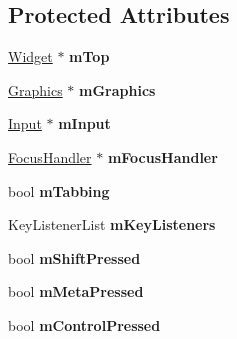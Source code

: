 \subsection*{Protected Attributes}
\begin{DoxyCompactItemize}
\item 
\hyperlink{classgcn_1_1Widget}{Widget} $\ast$ {\bfseries m\+Top}\hypertarget{classgcn_1_1Gui_a604a47aac29b2b2d102fb9adf33046dd}{}\label{classgcn_1_1Gui_a604a47aac29b2b2d102fb9adf33046dd}

\item 
\hyperlink{classgcn_1_1Graphics}{Graphics} $\ast$ {\bfseries m\+Graphics}\hypertarget{classgcn_1_1Gui_abf24a26828a0714cb5b35874f1aeb2aa}{}\label{classgcn_1_1Gui_abf24a26828a0714cb5b35874f1aeb2aa}

\item 
\hyperlink{classgcn_1_1Input}{Input} $\ast$ {\bfseries m\+Input}\hypertarget{classgcn_1_1Gui_a3a5628dce778c217e817b40e552c1dd4}{}\label{classgcn_1_1Gui_a3a5628dce778c217e817b40e552c1dd4}

\item 
\hyperlink{classgcn_1_1FocusHandler}{Focus\+Handler} $\ast$ {\bfseries m\+Focus\+Handler}\hypertarget{classgcn_1_1Gui_a6d52184d92b5fb94c9e431310e822bb9}{}\label{classgcn_1_1Gui_a6d52184d92b5fb94c9e431310e822bb9}

\item 
bool {\bfseries m\+Tabbing}\hypertarget{classgcn_1_1Gui_a1cb20f54584e46d504fabaeca4937991}{}\label{classgcn_1_1Gui_a1cb20f54584e46d504fabaeca4937991}

\item 
Key\+Listener\+List {\bfseries m\+Key\+Listeners}\hypertarget{classgcn_1_1Gui_ad8ab94f193d8a00eebc9c562e723a94c}{}\label{classgcn_1_1Gui_ad8ab94f193d8a00eebc9c562e723a94c}

\item 
bool {\bfseries m\+Shift\+Pressed}\hypertarget{classgcn_1_1Gui_a5b45556c2b53be0f21adb7e8374d9ca9}{}\label{classgcn_1_1Gui_a5b45556c2b53be0f21adb7e8374d9ca9}

\item 
bool {\bfseries m\+Meta\+Pressed}\hypertarget{classgcn_1_1Gui_af12c89543b16cffb8c2d3696058ea105}{}\label{classgcn_1_1Gui_af12c89543b16cffb8c2d3696058ea105}

\item 
bool {\bfseries m\+Control\+Pressed}\hypertarget{classgcn_1_1Gui_afc00084e5947095924a868c2a3e39c39}{}\label{classgcn_1_1Gui_afc00084e5947095924a868c2a3e39c39}


\end{DoxyCompactItemize}
